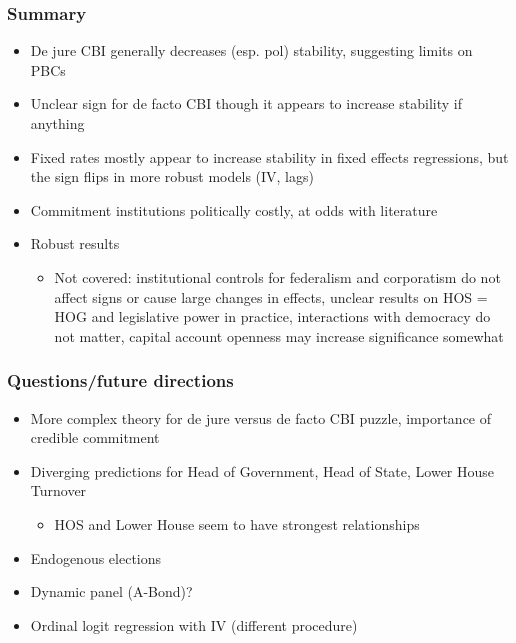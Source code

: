 \documentclass{beamer}
\begin{document}
    \begin{frame}
        \frametitle{Summary}
        \begin{itemize}
            \item De jure CBI generally decreases (esp. pol) stability, suggesting limits on PBCs
            \item Unclear sign for de facto CBI though it appears to increase stability if anything
            \item Fixed rates mostly appear to increase stability in fixed effects regressions, but the sign flips in more robust models (IV, lags)
            \item Commitment institutions politically costly, at odds with literature
            \item Robust results
            \begin{itemize}
                \item Not covered: institutional controls for federalism and corporatism do not affect signs or cause large changes in effects, unclear results on HOS = HOG and legislative power in practice, interactions with democracy do not matter, capital account openness may increase significance somewhat
            \end{itemize}
        \end{itemize}
    \end{frame}

    \begin{frame}
        \frametitle{Questions/future directions}
        \begin{itemize}
            \item More complex theory for de jure versus de facto CBI puzzle, importance of credible commitment
            \item Diverging predictions for Head of Government, Head of State, Lower House Turnover
            \begin{itemize}
                \item HOS and Lower House seem to have strongest relationships
            \end{itemize}
            \item Endogenous elections
            \item Dynamic panel (A-Bond)?
            \item Ordinal logit regression with IV (different procedure)
        \end{itemize}
    \end{frame}
\end{document}
